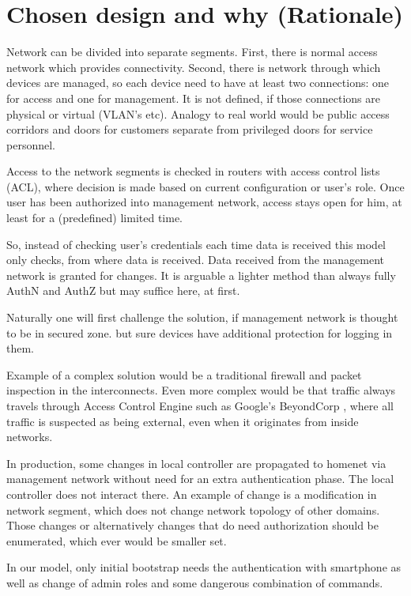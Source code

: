 \documentclass[12pt,a4paper,english]{tutthesis}
\begin{document}
\section{Chosen design and why (Rationale)}
\label{sec-4-3}
\label{sec:chosendesign}   
Network can be divided into separate segments. 
First, there is normal access network which provides
connectivity. Second, there is network through which devices are
managed, so each device need to have at least two connections: one for
access and one for management. It is not defined, if those connections
are physical or virtual (VLAN's etc). 
Analogy to real world would be public access corridors and doors for
customers separate from privileged doors for service personnel.

Access to the network segments is checked in routers with access control lists
(ACL), where decision is made based on current configuration or user's
role.  Once user has been authorized into management network, access
stays open for him, at least for a (predefined) limited time.

So, instead of checking user's credentials each time data is received
this model only checks, from where data is received. 
Data received from the management network is granted for changes.
It is arguable a lighter method than always
fully AuthN and AuthZ but may suffice here, at first.

Naturally one will first challenge the solution, if
management network is thought to be in secured zone.
but sure devices have additional protection for logging in them. 


Example of a complex solution would be a traditional firewall and packet
inspection in the interconnects. Even more complex would be that traffic
always travels through Access Control Engine such as Google's
BeyondCorp \cite{2014-beyondcorp}, where all
traffic is suspected as being external, even when it originates from inside networks.


In production, some changes in local controller are propagated to homenet
via management network without need for an extra authentication phase.
The local controller does not interact there. An example of change is
a modification in network segment, which does not change network topology of other domains.
Those changes or alternatively changes that do need authorization
should be enumerated, which ever would be smaller set.  

In our model, only initial bootstrap needs the authentication with
smartphone as well as change of admin roles and some dangerous
combination of commands.
\end{document}
